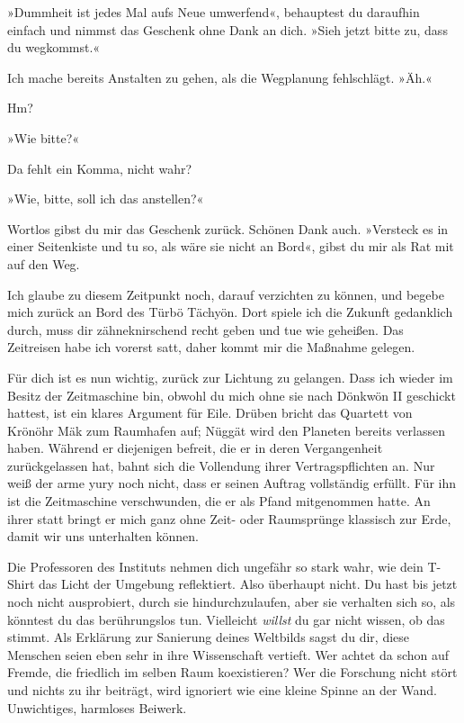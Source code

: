 »Dummheit ist jedes Mal aufs Neue umwerfend«, behauptest du daraufhin einfach und nimmst das Geschenk ohne Dank an dich. »Sieh jetzt bitte zu, dass du wegkommst.«

Ich mache bereits Anstalten zu gehen, als die Wegplanung fehlschlägt. »Äh.«

Hm?

»Wie bitte?«

Da fehlt ein Komma, nicht wahr?

»Wie, bitte, soll ich das anstellen?«

Wortlos gibst du mir das Geschenk zurück. Schönen Dank auch. »Versteck es in einer Seitenkiste und tu so, als wäre sie nicht an Bord«, gibst du mir als Rat mit auf den Weg.

Ich glaube zu diesem Zeitpunkt noch, darauf verzichten zu können, und begebe mich zurück an Bord des Türbö Tächyön. Dort spiele ich die Zukunft gedanklich durch, muss dir zähneknirschend recht geben und tue wie geheißen. Das Zeitreisen habe ich vorerst satt, daher kommt mir die Maßnahme gelegen.

Für dich ist es nun wichtig, zurück zur Lichtung zu gelangen. Dass ich wieder im Besitz der Zeitmaschine bin, obwohl du mich ohne sie nach Dönkwön II geschickt hattest, ist ein klares Argument für Eile. Drüben bricht das Quartett von Krönöhr Mäk zum Raumhafen auf; Nüggät wird den Planeten bereits verlassen haben. Während er diejenigen befreit, die er in deren Vergangenheit zurückgelassen hat, bahnt sich die Vollendung ihrer Vertragspflichten an. Nur weiß der arme yury noch nicht, dass er seinen Auftrag vollständig erfüllt. Für ihn ist die Zeitmaschine verschwunden, die er als Pfand mitgenommen hatte. An ihrer statt bringt er mich ganz ohne Zeit- oder Raumsprünge klassisch zur Erde, damit wir uns unterhalten können.

Die Professoren des Instituts nehmen dich ungefähr so stark wahr, wie dein T-Shirt das Licht der Umgebung reflektiert. Also überhaupt nicht. Du hast bis jetzt noch nicht ausprobiert, durch sie hindurchzulaufen, aber sie verhalten sich so, als könntest du das berührungslos tun. Vielleicht \emph{willst} du gar nicht wissen, ob das stimmt. Als Erklärung zur Sanierung deines Weltbilds sagst du dir, diese Menschen seien eben sehr in ihre Wissenschaft vertieft. Wer achtet da schon auf Fremde, die friedlich im selben Raum koexistieren? Wer die Forschung nicht stört und nichts zu ihr beiträgt, wird ignoriert wie eine kleine Spinne an der Wand. Unwichtiges, harmloses Beiwerk.


